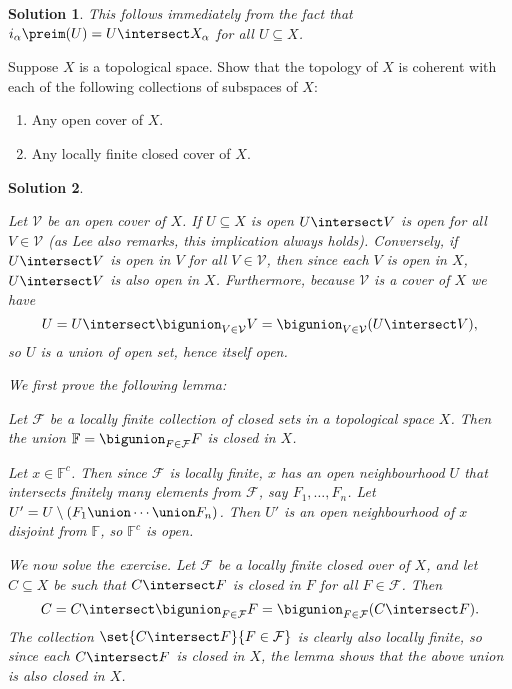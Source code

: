 \documentclass[article, a4paper, 11pt, oneside]{memoir}
\numberwithin{equation}{chapter}
\renewenvironment{problemframed}[1][]{%
    \setsepchar{.}%
    \readlist*\mylist{#1}%
    \def\smalllabel{\mylist[2].\mylist[3]}%
    \refstepcounter{problemframed}%
    \begin{problemframed*}[#1]%
    \label{prob:#1}%
}{%
    \end{problemframed*}%
}
\theoremstyle{nonumberplain}
\newtheorem{solution}{Solution}
\newenvironment{displaytheorem}{%
	\begin{displayquote}\itshape%
}{%
	\end{displayquote}%
}
\newcommand{\calV}{\mathcal{V}}
\newcommand{\calF}{\mathcal{F}}
\newcommand{\bbF}{\mathbb{F}}
\begin{document}
\begin{solution}
    This follows immediately from the fact that $i_\alpha\preim(U) = U \intersect X_\alpha$ for all $U \subseteq X$.
\end{solution}


\begin{problemframed}[5.6]
    Suppose $X$ is a topological space. Show that the topology of $X$ is coherent with each of the following collections of subspaces of $X$:
    \begin{enumerate}
        \item Any open cover of $X$.
        \item Any locally finite closed cover of $X$.
    \end{enumerate}
\end{problemframed}

\begin{solution}
\begin{solutionsec}
    \item Let $\calV$ be an open cover of $X$. If $U \subseteq X$ is open $U \intersect V$ is open for all $V \in \calV$ (as Lee also remarks, this implication always holds). Conversely, if $U \intersect V$ is open in $V$ for all $V \in \calV$, then since each $V$ is open in $X$, $U \intersect V$ is also open in $X$. Furthermore, because $\calV$ is a cover of $X$ we have
    \begin{equation*}
        U
            = U \intersect \bigunion_{V \in \calV} V
            = \bigunion_{V \in \calV} (U \intersect V),
    \end{equation*}
    so $U$ is a union of open set, hence itself open.

    \item We first prove the following lemma:
    \begin{displaytheorem}
        Let $\calF$ be a locally finite collection of closed sets in a topological space $X$. Then the union $\bbF = \bigunion_{F \in \calF} F$ is closed in $X$.
    \end{displaytheorem}
    Let $x \in \bbF^c$. Then since $\calF$ is locally finite, $x$ has an open neighbourhood $U$ that intersects finitely many elements from $\calF$, say $F_1, \ldots, F_n$. Let $U' = U \setminus (F_1 \union \cdots \union F_n)$. Then $U'$ is an open neighbourhood of $x$ disjoint from $\bbF$, so $\bbF^c$ is open.
    
    We now solve the exercise. Let $\calF$ be a locally finite closed over of $X$, and let $C \subseteq X$ be such that $C \intersect F$ is closed in $F$ for all $F \in \calF$. Then
    \begin{equation*}
        C
            = C \intersect \bigunion_{F \in \calF} F
            = \bigunion_{F \in \calF} (C \intersect F).
    \end{equation*}
    The collection $\set{C \intersect F}{F \in \calF}$ is clearly also locally finite, so since each $C \intersect F$ is closed in $X$, the lemma shows that the above union is also closed in $X$.
\end{solutionsec}
\end{solution}
\end{document}
